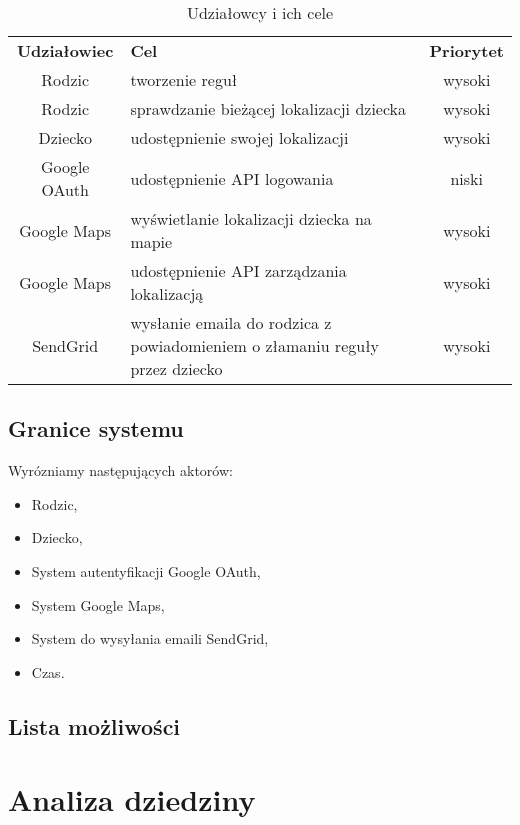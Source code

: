 \documentclass{sprawozdanie-agh}
\begin{document}
		\begin{table}[h]
			\begin{center}
				\begin{tabular}{|c|p{7cm}|c|}
					\cline{1-3}
					\textbf{Udziałowiec} & \textbf{Cel} & \textbf{Priorytet} \\
					\cline{1-3}
					Rodzic & tworzenie reguł & wysoki \\
					\cline{1-3}
					Rodzic & sprawdzanie bieżącej lokalizacji dziecka & wysoki \\
					\cline{1-3}
					Dziecko & udostępnienie swojej lokalizacji & wysoki \\
					\cline{1-3}
					Google OAuth & udostępnienie API logowania & niski \\
					\cline{1-3}
					Google Maps & wyświetlanie lokalizacji dziecka na mapie & wysoki \\
					\cline{1-3}
					Google Maps & udostępnienie API zarządzania lokalizacją & wysoki \\
					\cline{1-3}
					SendGrid & wysłanie emaila do rodzica z powiadomieniem o złamaniu reguły przez dziecko  & wysoki \\
					\cline{1-3}
				\end{tabular}
			\end{center}
			\caption{Udziałowcy i ich cele}
		\end{table}

		\subsection{Granice systemu}

		Wyrózniamy następujących aktorów:
		\begin{itemize}
			\item Rodzic,
			\item Dziecko,
			\item System autentyfikacji Google OAuth,
			\item System Google Maps,
			\item System do wysyłania emaili SendGrid,
			\item Czas.
		\end{itemize}

		\subsection{Lista możliwości}

	\section{Analiza dziedziny}
\end{document}
